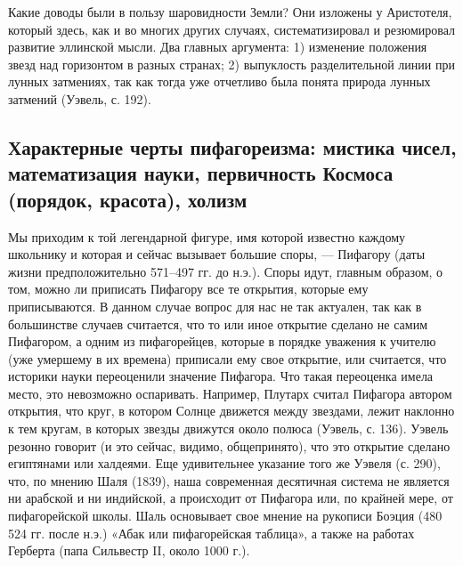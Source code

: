 Какие  доводы  были  в  пользу  шаровидности  Земли?  Они  изложены  у
Аристотеля,   который  здесь,   как  и   во  многих   других  случаях,
систематизировал и  резюмировал развитие эллинской мысли.  Два главных
аргумента:  1)  изменение  положения  звезд над  горизонтом  в  разных
странах; 2) выпуклость разделительной  линии при лунных затмениях, так
как тогда уже  отчетливо была понята природа  лунных затмений (Уэвель,
с. 192).

\subsection{Характерные    черты    пифагореизма:    мистика    чисел,
математизация науки, первичность Космоса (порядок, красота), холизм}

Мы приходим  к той  легендарной фигуре,  имя которой  известно каждому
школьнику  и которая  и сейчас  вызывает большие  споры, ---  Пифагору
(даты  жизни  предположительно  571--497  гг. до  н.э.).  Споры  идут,
главным образом, о  том, можно ли приписать Пифагору  все те открытия,
которые  ему приписываются.  В данном  случае  вопрос для  нас не  так
актуален, так  как в  большинстве случаев считается,  что то  или иное
открытие сделано не самим Пифагором,  а одним из пифагорейцев, которые
в порядке уважения к учителю (уже умершему в их времена) приписали ему
свое открытие, или считается,  что историки науки переоценили значение
Пифагора. Что такая переоценка имела место, это невозможно оспаривать.
Например,  Плутарх  считал  Пифагора  автором открытия,  что  круг,  в
котором Солнце движется между звездами, лежит наклонно к тем кругам, в
которых звезды движутся около полюса  (Уэвель, с. 136). Уэвель резонно
говорит (и это сейчас, видимо,  общепринято), что это открытие сделано
египтянами или халдеями. Еще удивительнее  указание того же Уэвеля (с.
290), что, по мнению Шаля  (1839), наша современная десятичная система
не является ни арабской и ни  индийской, а происходит от Пифагора или,
по крайней мере,  от пифагорейской школы. Шаль  основывает свое мнение
на рукописи  Боэция (480 524  гг. после н.э.) «Абак  или пифагорейская
таблица», а также  на работах Герберта (папа Сильвестр  II, около 1000
г.).

